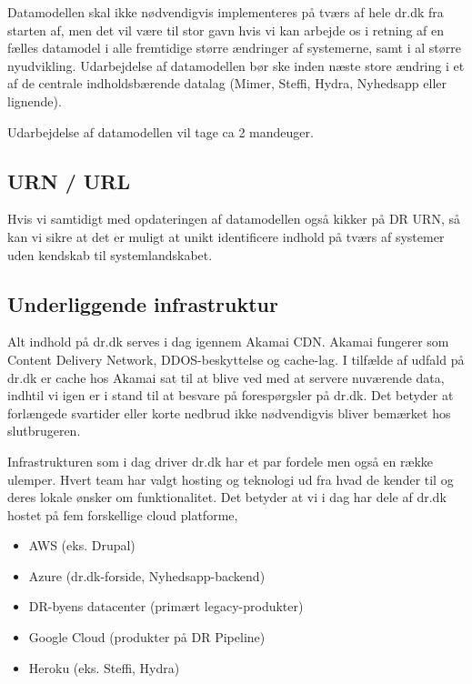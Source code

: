 \documentclass{article}
\begin{document}
Datamodellen skal ikke nødvendigvis implementeres på tværs af hele dr.dk fra starten af, men det vil være til stor gavn hvis vi kan arbejde os i retning af en fælles datamodel i alle fremtidige større ændringer af systemerne,
samt i al større nyudvikling.
Udarbejdelse af datamodellen bør ske inden næste store ændring i et af de centrale indholdsbærende datalag (Mimer, Steffi, Hydra, Nyhedsapp eller lignende).

Udarbejdelse af datamodellen vil tage ca 2 mandeuger.


\subsection{URN / URL}
Hvis vi samtidigt med opdateringen af datamodellen også kikker på DR URN, så kan vi sikre at det er muligt at unikt identificere indhold på tværs af systemer uden kendskab til systemlandskabet. 

\subsection{Underliggende infrastruktur}
Alt indhold på dr.dk serves i dag igennem Akamai CDN. Akamai fungerer som Content Delivery Network, DDOS-beskyttelse og cache-lag. I tilfælde af udfald på dr.dk er cache hos Akamai sat
til at blive ved med at servere nuværende data, indhtil vi igen er i stand til at besvare på forespørgsler på dr.dk. Det betyder at forlængede svartider eller korte nedbrud ikke nødvendigvis bliver bemærket hos slutbrugeren.

Infrastrukturen som i dag driver dr.dk har et par fordele men også en række ulemper. Hvert team har valgt hosting og teknologi ud fra hvad de kender til og deres lokale ønsker om funktionalitet. Det betyder at vi i dag har dele af dr.dk hostet på fem forskellige cloud platforme,

\begin{itemize}
    \item AWS (eks. Drupal)
    \item Azure (dr.dk-forside, Nyhedsapp-backend)
    \item DR-byens datacenter (primært legacy-produkter)
    \item Google Cloud (produkter på DR Pipeline)
    \item Heroku (eks. Steffi, Hydra)
\end{itemize}
\end{document}
